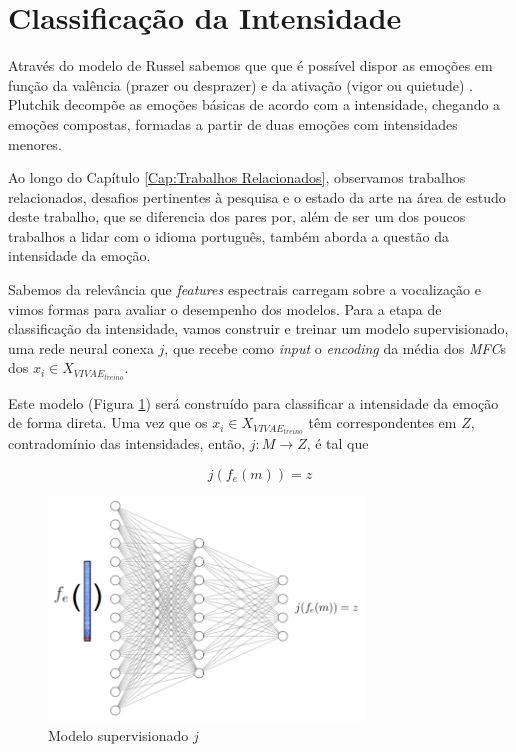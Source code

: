\section{Classificação da Intensidade}\label{sec:bravo_clf}

Através do modelo de Russel sabemos que que é possível dispor as emoções em função da valência (prazer ou desprazer) e da ativação (vigor ou quietude) \cite{27}. Plutchik decompõe as emoções básicas de acordo com a intensidade, chegando a emoções compostas, formadas a partir de duas emoções com intensidades menores.

Ao longo do Capítulo \ref{Cap:Trabalhos Relacionados}, observamos trabalhos relacionados, desafios pertinentes à pesquisa e o estado da arte na área de estudo deste trabalho, que se diferencia dos pares por, além de ser um dos poucos trabalhos a lidar com o idioma português, também aborda a questão da intensidade da emoção.

Sabemos da relevância que \textit{features} espectrais carregam sobre a vocalização e vimos formas para avaliar o desempenho dos modelos. Para a etapa de classificação da intensidade, vamos construir e treinar um modelo supervisionado, uma rede neural conexa $j$, que recebe como \textit{input} o \textit{encoding} da média dos \textit{MFC}s dos $x_i \in X_{VIVAE_{treino}}$.

Este modelo (Figura \ref{fig:jsupervisionado}) será construído para classificar a intensidade da emoção de forma direta. Uma vez que os $x_i \in X_{VIVAE_{treino}}$ têm correspondentes em $Z$, contradomínio das intensidades, então, $j: M \rightarrow Z$, é tal que

\begin{equation}
    j(f_e(m)) = z
\end{equation}

\begin{figure}[h]
    \centering
    \includegraphics[width=0.75\textwidth]{imagens/p-supervisionado.png}
    \caption{\label{fig:jsupervisionado}Modelo supervisionado $j$}
\end{figure}

